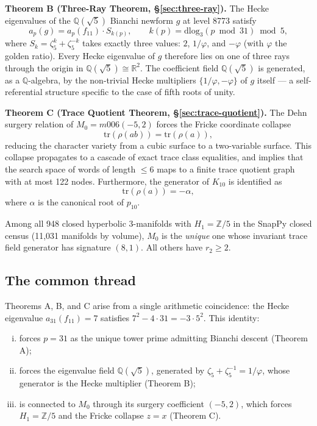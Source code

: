 \medskip
\textbf{Theorem B (Three-Ray Theorem, \S\ref{sec:three-ray}).}
The Hecke eigenvalues of the $\mathbb{Q}(\sqrt{5})$ Bianchi newform $g$
at level 8773 satisfy
\[
  a_p(g) = a_p(f_{11}) \cdot S_{k(p)},
  \qquad
  k(p) = \mathrm{dlog}_3(p \bmod 31) \bmod 5,
\]
where $S_k = \zeta_5^k + \zeta_5^{-k}$ takes exactly three values:
$2$, $1/\varphi$, and $-\varphi$ (with $\varphi$ the golden ratio).
Every Hecke eigenvalue of $g$ therefore lies on one of three rays through
the origin in $\mathbb{Q}(\sqrt{5}) \cong \mathbb{R}^2$.
The coefficient field $\mathbb{Q}(\sqrt{5})$ is generated, as a
$\mathbb{Q}$-algebra, by the non-trivial Hecke multipliers
$\{1/\varphi, -\varphi\}$ of $g$ itself — a self-referential structure
specific to the case of fifth roots of unity.

\medskip
\textbf{Theorem C (Trace Quotient Theorem, \S\ref{sec:trace-quotient}).}
The Dehn surgery relation of $M_0 = m006(-5,2)$ forces the Fricke
coordinate collapse
\[
  \mathrm{tr}(\rho(ab)) = \mathrm{tr}(\rho(a)),
\]
reducing the character variety from a cubic surface to a two-variable
surface. This collapse propagates to a cascade of exact trace class
equalities, and implies that the search space of words of length $\leq 6$
maps to a finite trace quotient graph with at most 122 nodes. Furthermore,
the generator of $K_{10}$ is identified as
\[
  \mathrm{tr}(\rho(a)) = -\alpha,
\]
where $\alpha$ is the canonical root of $p_{10}$.

Among all 948 closed hyperbolic 3-manifolds with $H_1 = \mathbb{Z}/5$
in the SnapPy closed census (11,031 manifolds by volume), $M_0$ is the
\emph{unique} one whose invariant trace field generator has signature
$(8,1)$. All others have $r_2 \geq 2$.

\subsection{The common thread}

Theorems A, B, and C arise from a single arithmetic coincidence: the
Hecke eigenvalue $a_{31}(f_{11}) = 7$ satisfies $7^2 - 4\cdot 31 = -3\cdot5^2$.
This identity:
\begin{enumerate}[(i)]
  \item forces $p = 31$ as the unique tower prime admitting Bianchi descent
        (Theorem A);
  \item forces the eigenvalue field $\mathbb{Q}(\sqrt{5})$, generated by
        $\zeta_5 + \zeta_5^{-1} = 1/\varphi$, whose generator is the
        Hecke multiplier (Theorem B);
  \item is connected to $M_0$ through its surgery coefficient $(-5,2)$,
        which forces $H_1 = \mathbb{Z}/5$ and the Fricke collapse
        $z = x$ (Theorem C).
\end{enumerate}

